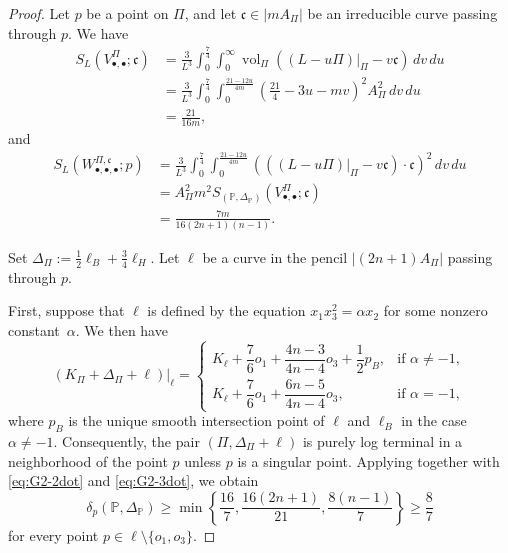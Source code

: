 \documentclass[10pt,a4paper]{amsart}
\begin{document}
\begin{proof}
Let  $p$ be a point on $\Pi$, and let $\mathfrak{c}\in |mA_\Pi|$ be an irreducible curve passing through $p$. We have
\begin{equation}\label{eq:G2-2dot}
\begin{split}
S_L(V_{\bullet,\bullet}^{\Pi};\mathfrak{c})
&=
\frac{3}{L^3}
\int_0^{\frac{7}{4}}
\int_0^{\infty}
\operatorname{vol}_{\Pi}\left((L-u\Pi)|_{\Pi}-v\mathfrak{c}\right)\,dv\,du \\
&=
\frac{3}{L^3}
\int_0^{\frac{7}{4}}
\int_0^{\frac{21-12u}{4m}}
\left(\frac{21}{4}-3u-mv\right)^2A_\Pi^2\,dv\,du \\
&=
\frac{21}{16m},
\end{split}
\end{equation}
and
\begin{equation}\label{eq:G2-3dot}
\begin{split}
S_L(W_{\bullet,\bullet,\bullet}^{\Pi,\mathfrak{c}};p)
&=
\frac{3}{L^3}
\int_0^{\frac{7}{4}}
\int_0^{\frac{21-12u}{4m}}
\left(\left((L-u\Pi)|_{\Pi}-v\mathfrak{c}\right)\cdot\mathfrak{c}\right)^2\,dv\,du \\
&=
A_\Pi^2m^2
S_{(\mathbb{P}, \Delta_\mathbb{P})}(V_{\bullet,\bullet}^{\Pi};\mathfrak{c}) \\
&=
\frac{7m}{16(2n+1)(n-1)}.
\end{split}
\end{equation}

Set
$
\Delta_{\Pi}:=\frac{1}{2}\ell_B+\frac{3}{4}\ell_H$.
Let $\ell$ be a curve in the pencil $|(2n+1)A_\Pi|$ passing through $p$.

First,  suppose  that $\ell$ is defined by the equation
$
x_1x_3^2=\alpha x_2
$
for some nonzero constant~$\alpha$. We then have
\[
\left(K_\Pi+\Delta_\Pi+\ell\right)\big|_\ell=
\begin{cases}
K_\ell+\dfrac{7}{6}o_1+\dfrac{4n-3}{4n-4}o_3+\dfrac{1}{2}p_B,
& \text{if }\alpha\neq -1, \\[1ex]
K_\ell+\dfrac{7}{6}o_1+\dfrac{6n-5}{4n-4}o_3,
& \text{if }\alpha=-1,
\end{cases}
\]
where $p_B$ is the unique smooth intersection point of $\ell$ and $\ell_B$ in the case $\alpha\neq -1$. 
Consequently, the pair $(\Pi,\Delta_\Pi+\ell)$ is purely log terminal in a neighborhood of the point $p$ unless $p$ is a singular point.
Applying \cite[Corollary~4.8]{Fu23} together with \eqref{eq:G2-2dot} and \eqref{eq:G2-3dot}, we obtain
\[
\delta_{p}\left(\mathbb{P},\Delta_\mathbb{P}\right)
\ge
\min\left\{
\frac{16}{7},
\frac{16(2n+1)}{21},
\frac{8(n-1)}{7}
\right\}
\ge
\frac{8}{7}
\]
for every point $p\in \ell\setminus\{o_1, o_3\}$.




\end{proof}
\end{document}
